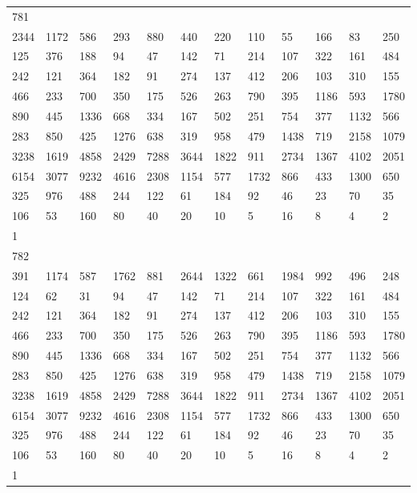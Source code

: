 \begin{longtable}{llllllllllll}
781&&&&&&&&&&&\\
2344& 1172& 586& 293& 880& 440& 220& 110& 55& 166& 83& 250\\
125& 376& 188& 94& 47& 142& 71& 214& 107& 322& 161& 484\\
242& 121& 364& 182& 91& 274& 137& 412& 206& 103& 310& 155\\
466& 233& 700& 350& 175& 526& 263& 790& 395& 1186& 593& 1780\\
890& 445& 1336& 668& 334& 167& 502& 251& 754& 377& 1132& 566\\
283& 850& 425& 1276& 638& 319& 958& 479& 1438& 719& 2158& 1079\\
3238& 1619& 4858& 2429& 7288& 3644& 1822& 911& 2734& 1367& 4102& 2051\\
6154& 3077& 9232& 4616& 2308& 1154& 577& 1732& 866& 433& 1300& 650\\
325& 976& 488& 244& 122& 61& 184& 92& 46& 23& 70& 35\\
106& 53& 160& 80& 40& 20& 10& 5& 16& 8& 4& 2\\
1& \\

782&&&&&&&&&&&\\
391& 1174& 587& 1762& 881& 2644& 1322& 661& 1984& 992& 496& 248\\
124& 62& 31& 94& 47& 142& 71& 214& 107& 322& 161& 484\\
242& 121& 364& 182& 91& 274& 137& 412& 206& 103& 310& 155\\
466& 233& 700& 350& 175& 526& 263& 790& 395& 1186& 593& 1780\\
890& 445& 1336& 668& 334& 167& 502& 251& 754& 377& 1132& 566\\
283& 850& 425& 1276& 638& 319& 958& 479& 1438& 719& 2158& 1079\\
3238& 1619& 4858& 2429& 7288& 3644& 1822& 911& 2734& 1367& 4102& 2051\\
6154& 3077& 9232& 4616& 2308& 1154& 577& 1732& 866& 433& 1300& 650\\
325& 976& 488& 244& 122& 61& 184& 92& 46& 23& 70& 35\\
106& 53& 160& 80& 40& 20& 10& 5& 16& 8& 4& 2\\
1& \\


\end{longtable}
